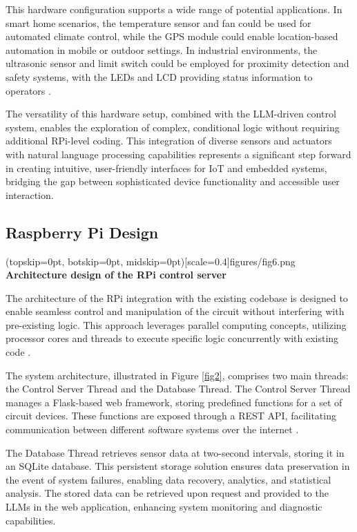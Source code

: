 \documentclass{ieeeaccess}
\begin{document}
This hardware configuration supports a wide range of potential applications. In smart home scenarios, the temperature sensor and fan could be used for automated climate control, while the GPS module could enable location-based automation in mobile or outdoor settings. In industrial environments, the ultrasonic sensor and limit switch could be employed for proximity detection and safety systems, with the LEDs and LCD providing status information to operators \cite{mcmanus2021}.

The versatility of this hardware setup, combined with the LLM-driven control system, enables the exploration of complex, conditional logic without requiring additional RPi-level coding. This integration of diverse sensors and actuators with natural language processing capabilities represents a significant step forward in creating intuitive, user-friendly interfaces for IoT and embedded systems, bridging the gap between sophisticated device functionality and accessible user interaction.

\subsection{Raspberry Pi Design}

\Figure[t!](topskip=0pt, botskip=0pt,
midskip=0pt)[scale=0.4]{{figures/fig6.png}}
{ \textbf{Architecture design of the RPi control server}\label{fig2}}

The architecture of the RPi integration with the existing codebase is designed to enable seamless control and manipulation of the circuit without interfering with pre-existing logic. This approach leverages parallel computing concepts, utilizing processor cores and threads to execute specific logic concurrently with existing code \cite{wilkinson2005parallel}.

The system architecture, illustrated in Figure  \ref{fig2}, comprises two main threads: the Control Server Thread and the Database Thread. The Control Server Thread manages a Flask-based web framework, storing predefined functions for a set of circuit devices. These functions are exposed through a REST API, facilitating communication between different software systems over the internet \cite{Surwase2016RESTAM}.

The Database Thread retrieves sensor data at two-second intervals, storing it in an SQLite database. This persistent storage solution ensures data preservation in the event of system failures, enabling data recovery, analytics, and statistical analysis. The stored data can be retrieved upon request and provided to the LLMs in the web application, enhancing system monitoring and diagnostic capabilities.
\end{document}
